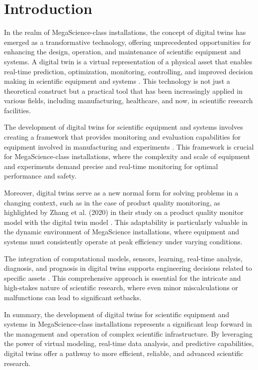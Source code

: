 \section{Introduction}

In the realm of MegaScience-class installations, the concept of digital twins
has emerged as a transformative technology, offering unprecedented
opportunities for enhancing the design, operation, and maintenance of
scientific equipment and systems. A digital twin is a virtual representation of
a physical asset that enables real-time prediction, optimization, monitoring,
controlling, and improved decision making in scientific equipment and systems
\cite{Rasheed2020Digital}. This technology is not just a theoretical construct
but a practical tool that has been increasingly applied in various fields,
including manufacturing, healthcare, and now, in scientific research
facilities.

The development of digital twins for scientific equipment and systems involves
creating a framework that provides monitoring and evaluation capabilities for
equipment involved in manufacturing and experiments \cite{Duan2021Design}. This
framework is crucial for MegaScience-class installations, where the complexity
and scale of equipment and experiments demand precise and real-time monitoring
for optimal performance and safety.

Moreover, digital twins serve as a new normal form for solving problems in a
changing context, such as in the case of product quality monitoring, as
highlighted by Zhang et al. (2020) in their study on a product quality monitor
model with the digital twin model \cite{Zhang2020A}. This adaptability is particularly
valuable in the dynamic environment of MegaScience installations, where
equipment and systems must consistently operate at peak efficiency under
varying conditions.

The integration of computational models, sensors, learning, real-time analysis,
diagnosis, and prognosis in digital twins supports engineering decisions
related to specific assets \cite{Ritto2021Digital}. This comprehensive approach
is essential for the intricate and high-stakes nature of scientific research,
where even minor miscalculations or malfunctions can lead to significant
setbacks.

In summary, the development of digital twins for scientific equipment and
systems in MegaScience-class installations represents a significant leap
forward in the management and operation of complex scientific infrastructure.
By leveraging the power of virtual modeling, real-time data analysis, and
predictive capabilities, digital twins offer a pathway to more efficient,
reliable, and advanced scientific research.
